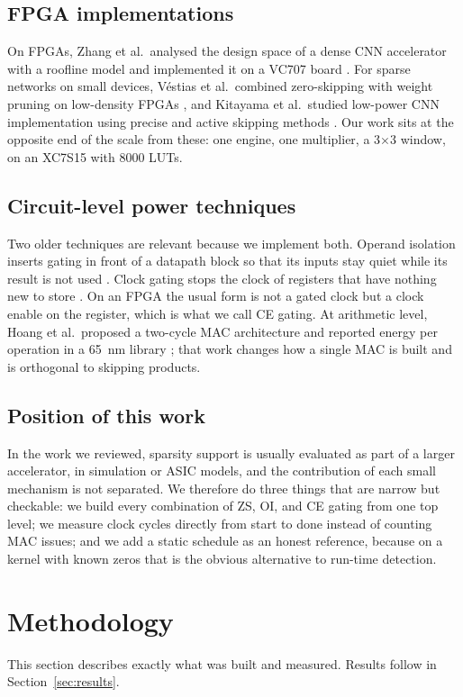 \documentclass[11pt,journal,draftclsnofoot,onecolumn]{IEEEtran}
\begin{document}
\subsection{FPGA implementations}
On FPGAs, Zhang et al.\ analysed the design space of a dense CNN accelerator with a
roofline model and implemented it on a VC707 board \cite{zhang2015}. For sparse
networks on small devices, V\'estias et al.\ combined zero-skipping with weight pruning
on low-density FPGAs \cite{vestias2019}, and Kitayama et al.\ studied low-power CNN
implementation using precise and active skipping methods \cite{kitayama2021}. Our work
sits at the opposite end of the scale from these: one engine, one multiplier, a
3$\times$3 window, on an XC7S15 with 8000 LUTs.

\subsection{Circuit-level power techniques}
Two older techniques are relevant because we implement both. Operand isolation inserts
gating in front of a datapath block so that its inputs stay quiet while its result is
not used \cite{munch2000}. Clock gating stops the clock of registers that have nothing
new to store \cite{wu2000}. On an FPGA the usual form is not a gated clock but a clock
enable on the register, which is what we call CE gating. At arithmetic level, Hoang et
al.\ proposed a two-cycle MAC architecture and reported energy per operation in a 65~nm
library \cite{hoang2010}; that work changes how a single MAC is built and is
orthogonal to skipping products.

\subsection{Position of this work}
In the work we reviewed, sparsity support is usually evaluated as part of a larger
accelerator, in simulation or ASIC models, and the contribution of each small mechanism
is not separated. We therefore do three things that are narrow but checkable: we build
every combination of ZS, OI, and CE gating from one top level; we measure clock cycles
directly from start to done instead of counting MAC issues; and we add a static
schedule as an honest reference, because on a kernel with known zeros that is the
obvious alternative to run-time detection.

\section{Methodology}\label{sec:method}
This section describes exactly what was built and measured. Results follow in
Section~\ref{sec:results}.
\end{document}
